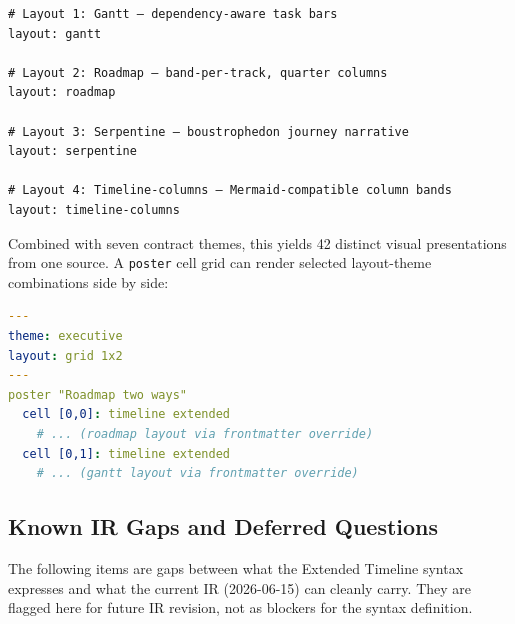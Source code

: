 \begin{lstlisting}[caption={Same source, four layout variants}]
# Layout 1: Gantt — dependency-aware task bars
layout: gantt

# Layout 2: Roadmap — band-per-track, quarter columns
layout: roadmap

# Layout 3: Serpentine — boustrophedon journey narrative
layout: serpentine

# Layout 4: Timeline-columns — Mermaid-compatible column bands
layout: timeline-columns
\end{lstlisting}

\noindent
Combined with seven contract themes, this yields 42 distinct visual
presentations from one source.  A \texttt{poster} cell grid can render
selected layout-theme combinations side by side:

\begin{lstlisting}[language=yaml,caption={Poster showcasing two layout variants of the same source}]
---
theme: executive
layout: grid 1x2
---
poster "Roadmap two ways"
  cell [0,0]: timeline extended
    # ... (roadmap layout via frontmatter override)
  cell [0,1]: timeline extended
    # ... (gantt layout via frontmatter override)
\end{lstlisting}

\subsection{Known IR Gaps and Deferred Questions}
\label{sec:et-gaps}

The following items are gaps between what the Extended Timeline syntax
expresses and what the current IR (2026-06-15) can cleanly carry.  They are
flagged here for future IR revision, not as blockers for the syntax
definition.

